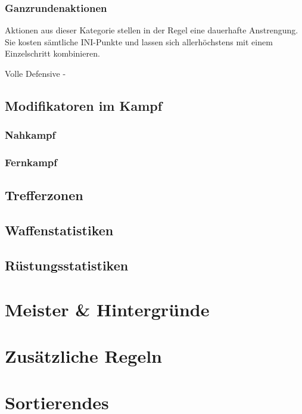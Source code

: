 \documentclass[a4paper,12pt,oneside]{book}
\begin{document}
\section{Ganzrundenaktionen}
Aktionen aus dieser Kategorie stellen in der Regel eine dauerhafte Anstrengung. Sie kosten sämtliche INI-Punkte und lassen sich allerhöchstens mit einem Einzelschritt kombinieren.
\begin{description}
\item[Volle Defensive -]
\end{description}


\chapter{Modifikatoren im Kampf}

\section{Nahkampf}

\section{Fernkampf}

\chapter{Trefferzonen}

\chapter{Waffenstatistiken}

\chapter{Rüstungsstatistiken}
\part{Meister \& Hintergründe}
\setcounter{chapter}{0}
\part{Zusätzliche Regeln}
\setcounter{chapter}{0}

\part{Sortierendes}
\end{document}
